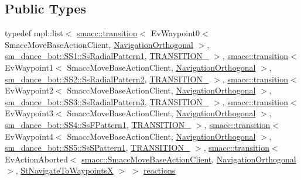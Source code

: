 \subsection*{Public Types}
\begin{DoxyCompactItemize}
\item 
typedef mpl\+::list$<$ \hyperlink{classsmacc_1_1transition}{smacc\+::transition}$<$ Ev\+Waypoint0$<$ Smacc\+Move\+Base\+Action\+Client, \hyperlink{classsm__dance__bot_1_1NavigationOrthogonal}{Navigation\+Orthogonal} $>$, \hyperlink{structsm__dance__bot_1_1SS1_1_1SsRadialPattern1}{sm\+\_\+dance\+\_\+bot\+::\+S\+S1\+::\+Ss\+Radial\+Pattern1}, \hyperlink{structsm__dance__bot_1_1StNavigateToWaypointsX_1_1TRANSITION__1}{T\+R\+A\+N\+S\+I\+T\+I\+O\+N\+\_} $>$, \hyperlink{classsmacc_1_1transition}{smacc\+::transition}$<$ Ev\+Waypoint1$<$ Smacc\+Move\+Base\+Action\+Client, \hyperlink{classsm__dance__bot_1_1NavigationOrthogonal}{Navigation\+Orthogonal} $>$, \hyperlink{structsm__dance__bot_1_1SS2_1_1SsRadialPattern2}{sm\+\_\+dance\+\_\+bot\+::\+S\+S2\+::\+Ss\+Radial\+Pattern2}, \hyperlink{structsm__dance__bot_1_1StNavigateToWaypointsX_1_1TRANSITION__2}{T\+R\+A\+N\+S\+I\+T\+I\+O\+N\+\_} $>$, \hyperlink{classsmacc_1_1transition}{smacc\+::transition}$<$ Ev\+Waypoint2$<$ Smacc\+Move\+Base\+Action\+Client, \hyperlink{classsm__dance__bot_1_1NavigationOrthogonal}{Navigation\+Orthogonal} $>$, \hyperlink{structsm__dance__bot_1_1SS3_1_1SsRadialPattern3}{sm\+\_\+dance\+\_\+bot\+::\+S\+S3\+::\+Ss\+Radial\+Pattern3}, \hyperlink{structsm__dance__bot_1_1StNavigateToWaypointsX_1_1TRANSITION__3}{T\+R\+A\+N\+S\+I\+T\+I\+O\+N\+\_} $>$, \hyperlink{classsmacc_1_1transition}{smacc\+::transition}$<$ Ev\+Waypoint3$<$ Smacc\+Move\+Base\+Action\+Client, \hyperlink{classsm__dance__bot_1_1NavigationOrthogonal}{Navigation\+Orthogonal} $>$, \hyperlink{structsm__dance__bot_1_1SS4_1_1SsFPattern1}{sm\+\_\+dance\+\_\+bot\+::\+S\+S4\+::\+Ss\+F\+Pattern1}, \hyperlink{structsm__dance__bot_1_1StNavigateToWaypointsX_1_1TRANSITION__4}{T\+R\+A\+N\+S\+I\+T\+I\+O\+N\+\_} $>$, \hyperlink{classsmacc_1_1transition}{smacc\+::transition}$<$ Ev\+Waypoint4$<$ Smacc\+Move\+Base\+Action\+Client, \hyperlink{classsm__dance__bot_1_1NavigationOrthogonal}{Navigation\+Orthogonal} $>$, \hyperlink{structsm__dance__bot_1_1SS5_1_1SsSPattern1}{sm\+\_\+dance\+\_\+bot\+::\+S\+S5\+::\+Ss\+S\+Pattern1}, \hyperlink{structsm__dance__bot_1_1StNavigateToWaypointsX_1_1TRANSITION__5}{T\+R\+A\+N\+S\+I\+T\+I\+O\+N\+\_} $>$, \hyperlink{classsmacc_1_1transition}{smacc\+::transition}$<$ Ev\+Action\+Aborted$<$ \hyperlink{classsmacc_1_1SmaccMoveBaseActionClient}{smacc\+::\+Smacc\+Move\+Base\+Action\+Client}, \hyperlink{classsm__dance__bot_1_1NavigationOrthogonal}{Navigation\+Orthogonal} $>$, \hyperlink{structsm__dance__bot_1_1StNavigateToWaypointsX}{St\+Navigate\+To\+WaypointsX} $>$ $>$ \hyperlink{structsm__dance__bot_1_1StNavigateToWaypointsX_a3de5fc6f5fa7646cdc7785a1d049af31}{reactions}
\end{DoxyCompactItemize}
